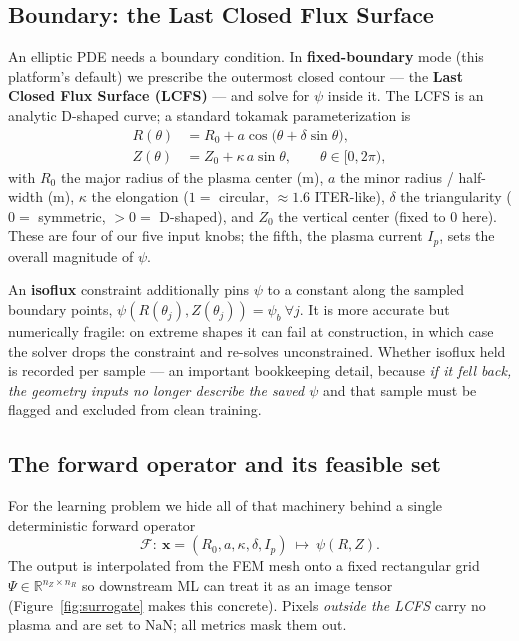 \documentclass[11pt]{article}
\newcommand{\bx}{\mathbf{x}}
\newcommand{\Ffwd}{\mathcal{F}}
\newcommand{\R}{\mathbb{R}}
\begin{document}
\subsection{Boundary: the Last Closed Flux Surface}
An elliptic PDE needs a boundary condition. In \textbf{fixed-boundary} mode (this platform's
default) we prescribe the outermost closed contour --- the \textbf{Last Closed Flux Surface
(LCFS)} --- and solve for $\psi$ inside it. The LCFS is an analytic D-shaped curve; a standard
tokamak parameterization is
\begin{equation}
\begin{aligned}
R(\theta) &= R_0 + a\cos\!\big(\theta + \delta\sin\theta\big),\\
Z(\theta) &= Z_0 + \kappa\, a\sin\theta, \qquad \theta\in[0,2\pi),
\end{aligned}
\end{equation}
with $R_0$ the major radius of the plasma center (m), $a$ the minor radius / half-width (m),
$\kappa$ the elongation ($1=$ circular, $\approx1.6$ ITER-like), $\delta$ the triangularity
($0=$ symmetric, $>0=$ D-shaped), and $Z_0$ the vertical center (fixed to $0$ here). These are
four of our five input knobs; the fifth, the plasma current $I_p$, sets the overall magnitude of
$\psi$.

An \textbf{isoflux} constraint additionally pins $\psi$ to a constant along the sampled boundary
points, $\psi(R(\theta_j),Z(\theta_j))=\psi_b\ \forall j$. It is more accurate but numerically
fragile: on extreme shapes it can fail at construction, in which case the solver drops the
constraint and re-solves unconstrained. Whether isoflux held is recorded per sample --- an
important bookkeeping detail, because \emph{if it fell back, the geometry inputs no longer describe
the saved $\psi$} and that sample must be flagged and excluded from clean training.

\subsection{The forward operator and its feasible set}
For the learning problem we hide all of that machinery behind a single deterministic forward
operator
\begin{equation}
\Ffwd:\ \bx=(R_0,a,\kappa,\delta,I_p)\ \longmapsto\ \psi(R,Z).
\end{equation}
The output is interpolated from the FEM mesh onto a fixed rectangular grid
$\Psi\in\R^{n_Z\times n_R}$ so downstream ML can treat it as an image tensor
(Figure~\ref{fig:surrogate} makes this concrete). Pixels \emph{outside the LCFS} carry no plasma
and are set to $\mathrm{NaN}$; all metrics mask them out.
\end{document}
